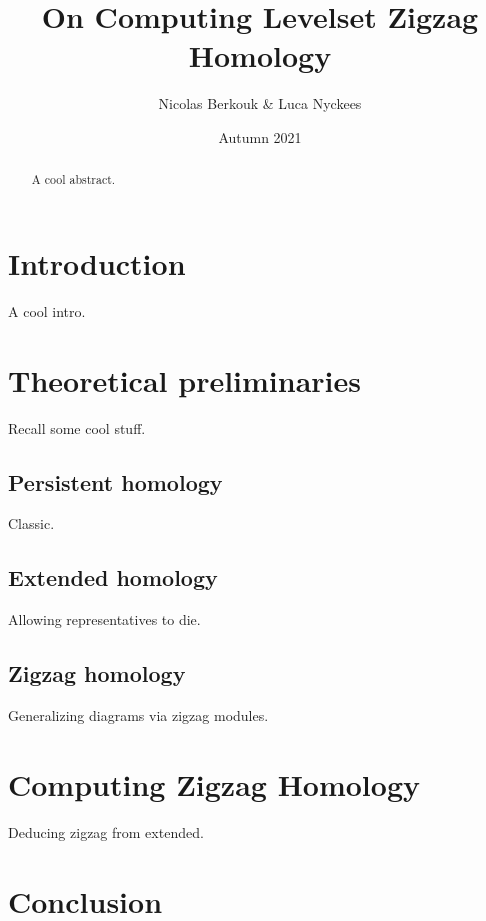 \documentclass{article}
\title{On Computing Levelset Zigzag Homology}
\author{Nicolas Berkouk \& Luca Nyckees}
\date{Autumn 2021}
\begin{document}
\maketitle

\begin{abstract}
    A cool abstract.
\end{abstract}

\section{Introduction}
A cool intro.

\section{Theoretical preliminaries}

Recall some cool stuff.

\subsection{Persistent homology}
Classic.
\subsection{Extended homology}
Allowing representatives to die.
\subsection{Zigzag homology}
Generalizing diagrams via zigzag modules.

\section{Computing Zigzag Homology}
Deducing zigzag from extended.

\section{Conclusion}
\end{document}
